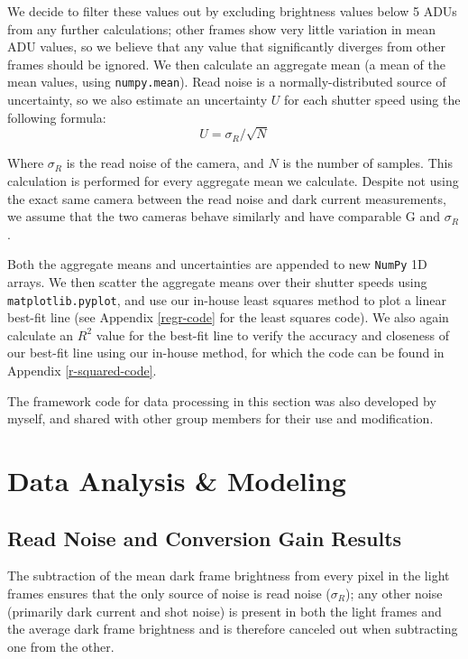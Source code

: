\documentclass[preprint2]{aastex702}
\begin{document}
			We decide to filter these values out by excluding brightness values below 5 ADUs from any further calculations; other frames show very little variation in mean ADU values, so we believe that any value that significantly diverges from other frames should be ignored. We then calculate an aggregate mean (a mean of the mean values, using \texttt{numpy.mean}). Read noise is a normally-distributed source of uncertainty, so we also estimate an uncertainty $U$ for each shutter speed using the following formula:
			\begin{equation}\label{norm-reduc}
				U = \sigma_{R} / \sqrt{N}
			\end{equation}

			Where $\sigma_R$ is the read noise of the camera, and $N$ is the number of samples. This calculation is performed for every aggregate mean we calculate. Despite not using the exact same camera between the read noise and dark current measurements, we assume that the two cameras behave similarly and have comparable G and $\sigma_R$.

			Both the aggregate means and uncertainties are appended to new \texttt{NumPy} 1D arrays. We then scatter the aggregate means over their shutter speeds using \texttt{matplotlib.pyplot}, and use our in-house least squares method to plot a linear best-fit line (see Appendix \ref{regr-code} for the least squares code). We also again calculate an $R^2$ value for the best-fit line to verify the accuracy and closeness of our best-fit line using our in-house method, for which the code can be found in Appendix \ref{r-squared-code}.

			The framework code for data processing in this section was also developed by myself, and shared with other group members for their use and modification.

    \section{Data Analysis \& Modeling}\label{sec:anal}

		\subsection{Read Noise and Conversion Gain Results}\label{ssec:4.2.4-results}

			The subtraction of the mean dark frame brightness from every pixel in the light frames ensures that the only source of noise is read noise ($\sigma_R$); any other noise (primarily dark current and shot noise) is present in both the light frames and the average dark frame brightness and is therefore canceled out when subtracting one from the other.
\end{document}
